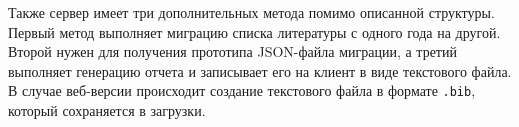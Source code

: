Также сервер имеет три дополнительных метода помимо описанной структуры. 
Первый метод выполняет миграцию списка литературы с одного года на другой.
Второй нужен для получения прототипа JSON-файла миграции, а третий выполняет генерацию отчета
и записывает его на клиент в виде текстового файла. В случае веб-версии происходит создание текстового файла в формате \texttt{.bib}, который
сохраняется в загрузки.